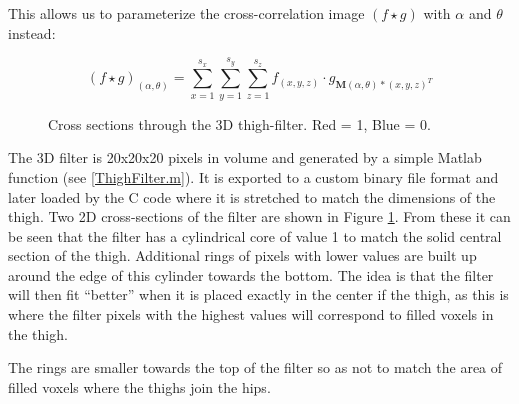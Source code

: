 This allows us to parameterize the cross-correlation image $(f \star g)$ with $\alpha$ and $\theta$ instead:

\begin{equation}
	(f \star g)_{(\alpha,\theta)} = \sum_{x=1}^{s_{x}} \sum_{y=1}^{s_{y}} \sum_{z=1}^{s_{z}} f_{(x,y,z)} \cdot g_{\mathbf{M}(\alpha,\theta) * (x,y,z)^T}
	\label{eqn:CrossCorrelation}
\end{equation}


\begin{figure}[tb]
	\centering
	\quad
	\caption{Cross sections through the 3D thigh-filter.  Red = 1, Blue = 0.}
	\label{ThighFilterCrossSections}
\end{figure}

\bigskip
\noindent The 3D filter is 20x20x20 pixels in volume and generated by a simple Matlab function (see \ref{ThighFilter.m}).
It is exported to a custom binary file format and later loaded by the C code where it is stretched to match the dimensions of the thigh.
Two 2D cross-sections of the filter are shown in Figure \ref{ThighFilterCrossSections}.
From these it can be seen that the filter has a cylindrical core of value 1 to match the solid central section of the thigh.
Additional rings of pixels with lower values are built up around the edge of this cylinder towards the bottom.
The idea is that the filter will then fit ``better'' when it is placed exactly in the center if the thigh,
as this is where the filter pixels with the highest values will correspond to filled voxels in the thigh.

The rings are smaller towards the top of the filter so as not to match the area of filled voxels where the thighs join the hips.

